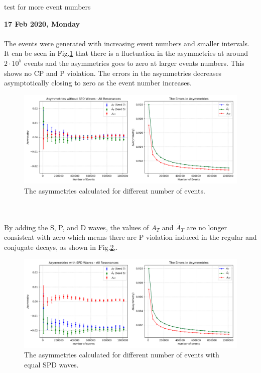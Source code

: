 test for more event numbers


\clearpage
\noindent\textbf{17 Feb 2020, Monday}
\\
\\
The events were generated with increasing event numbers and smaller intervals. It can be seen in Fig.\ref{acp_nospd} that there is a fluctuation in the asymmetries at around $2\cdot 10^5$ events and the asymmetries goes to zero at larger events numbers. This shows no CP and P violation. The errors in the asymmetries decreases asymptotically closing to zero as the event number increases.
\\
\begin{figure}[h]
\center
\includegraphics*[width=0.96\linewidth]{a_cp/acp_nospd}
\caption{The asymmetries calculated for different number of events.}
\label{acp_nospd}
\end{figure}
\\
\\
By adding the S, P, and D waves, the values of $A_T$ and $\bar{A}_T$ are no longer consistent with zero which means there are P violation induced in the regular and conjugate decays, as shown in Fig.\ref{acp_spd},.
\begin{figure}[h]
\center
\includegraphics*[width=0.96\linewidth]{a_cp/acp_spd}
\caption{The asymmetries calculated for different number of events with equal SPD waves.}
\label{acp_spd}
\end{figure}

